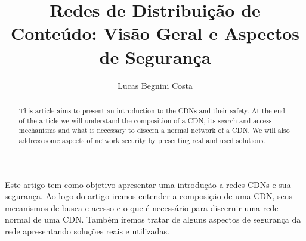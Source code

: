 \documentclass[12pt]{article}
\title{Redes de Distribui\c{c}\~ao de Conteúdo: Vis\~ao Geral e Aspectos de Seguran\c{c}a}
\author{Lucas Begnini Costa\inst{1}}
\begin{document}
 

\maketitle

\begin{resumo} 
Este artigo tem como objetivo apresentar uma introdu\c{c}\~ao a redes CDNs e sua seguran\c{c}a. Ao logo do artigo iremos entender a composi\c{c}\~ao de uma CDN, seus mecanismos de busca e acesso e o que \'e necess\'ario para discernir uma rede normal de uma CDN. Tamb\'em iremos tratar de alguns aspectos de seguran\c{c}a da rede apresentando solu\c{c}\~oes reais e utilizadas.
\end{resumo}

\begin{abstract}
This article aims to present an introduction to the CDNs and their safety. At the end of the article we will understand the composition of a CDN, its search and access mechanisms and what is necessary to discern a normal network of a CDN. We will also address some aspects of network security by presenting real and used solutions.
\end{abstract}
 
\maketitle

\tableofcontents %
     








\newpage



\end{document}
